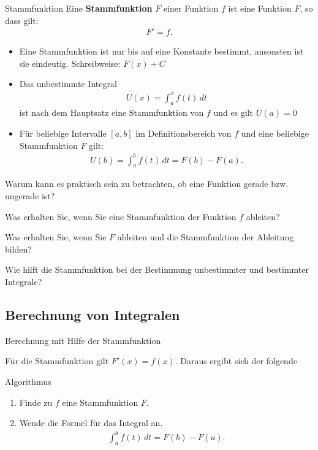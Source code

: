 \begin{frame}{Stammfunktion}
     Eine \textbf{Stammfunktion} $F$ einer Funktion $f$ ist eine Funktion $F$, so dass gilt:
     \begin{gather*}
         F' = f.
     \end{gather*}
 
    \begin{itemize}
    \item<+-> Eine Stammfunktion ist nur bis auf eine Konstante bestimmt, ansonsten ist sie eindeutig. Schreibweise: $F(x)+C$
    \item<+-> Das unbestimmte Integral
    \begin{gather*}
        U(x) = \int_a^x f(t)\,dt
    \end{gather*}
    ist nach dem Hauptsatz eine Stammfunktion von $f$ und es gilt $U(a) = 0$
    \item<+-> Für beliebige Intervalle $[a,b]$ im Definitionsbereich von $f$ und eine beliebige Stammfunktion $F$ gilt:
     \begin{gather*}
         U(b) = \int_a^b f(t)\,dt = F(b)-F(a).
     \end{gather*}
     \end{itemize}
\end{frame}

\begin{Abschluss}
\item Warum kann es praktisch sein zu betrachten, ob eine Funktion gerade bzw. ungerade ist?
\item Was erhalten Sie, wenn Sie eine Stammfunktion der Funktion $f$ ableiten?
\item Was erhalten Sie, wenn Sie $F$ ableiten und die Stammfunktion der Ableitung bilden?
\item Wie hilft die Stammfunktion bei der Bestimmung unbestimmter und bestimmter Integrale?
\end{Abschluss}

\subsection{Berechnung von Integralen}
\begin{frame}{Berechnung mit Hilfe der Stammfunktion}

    Für die Stammfunktion gilt $F'(x) = f(x)$. Daraus ergibt sich der folgende
    \begin{block}{Algorithmus}
        \begin{enumerate}
        \item Finde zu $f$ eine Stammfunktion $F$.
        \item Wende die Formel für das Integral an.
     \begin{gather*}
         \int_a^b f(t)\,dt = F(b)-F(a).
     \end{gather*}
    \end{enumerate}
    \end{block}
\end{frame}

